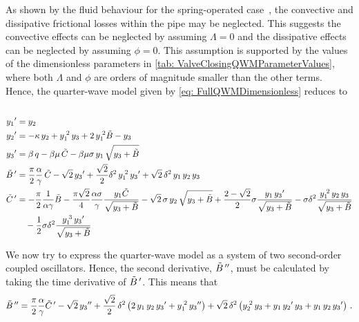 As shown by the fluid behaviour for the spring-operated case~\cite{Hos2015ModelPipe}, the convective and dissipative frictional losses within the pipe may be neglected. This suggests the convective effects can be neglected by assuming $\Lambda = 0$ and the dissipative effects can be neglected by assuming $\phi = 0$. This assumption is supported by the values of the dimensionless parameters in \cref{tab: ValveClosingQWMParameterValues}, where both $\Lambda$ and $\phi$ are orders of magnitude smaller than the other terms. Hence, the quarter-wave model given by \cref{eq: FullQWMDimensionless} reduces to
~
\begin{equation}
\begin{split}
    \dash{y_1} &= y_2 \\
    \dash{y_2} &= - \kappa \, y_2 + y_1\power{2} \, y_3 + 2 \, y_1\power{2} \tilde{B} - y_3 \\
    \dash{y_3} &= \beta \, q - \beta \mu \, \tilde{C} - \beta \mu \sigma \, y_1 \, \sqrt{y_3 + \tilde{B}} \\
    \dash{\tilde{B}\,} &= \frac{\pi}{2} \frac{\alpha}{\gamma} \, \tilde{C} - \sqrt{2} \, \dash{y_3} + \frac{\sqrt{2}}{2} \delta^2 \, y_1\power{2} \, \dash{y_3} + \sqrt{2} \, \delta^2 \, y_1 \, y_2 \, y_3 \\
    \dash{\tilde{C}\,} &=
    - \frac{\pi}{2} \frac{1}{\alpha \gamma} \tilde{B}
    - \frac{\pi \sqrt{2}}{4} \frac{\alpha \sigma}{\gamma} \frac{y_1 \tilde{C}}{\sqrt{y_3 + \tilde{B}}}
    - \sqrt{2} \, \sigma \, y_2 \, \sqrt{y_3 + \tilde{B}}
    + \frac{2-\sqrt{2}}{2} \sigma \frac{y_1 \, \dash{y_3}}{\sqrt{y_3 + \tilde{B}}}
    - \sigma \delta^2 \frac{y_1\power{2} \, y_2 \, y_3}{\sqrt{y_3 + \tilde{B}}}
    \\ & \quad %
    - \frac{1}{2} \sigma \delta^2 \frac{y_1\power{3} \, \dash{y_3}}{\sqrt{y_3 + \tilde{B}}} 
\end{split}
\end{equation}

We now try to express the quarter-wave model as a system of two second-order coupled oscillators. Hence, the second derivative, $\tilde{B}\,{''}$, must be calculated by taking the time derivative of $\tilde{B}\,{'}$. This means that
~
\begin{equation*}
    \tilde{B}\,{''} = \frac{\pi}{2} \frac{\alpha}{\gamma} \tilde{C}\,{'} - \sqrt{2} \, y_3{''} + \frac{\sqrt{2}}{2} \, \delta^2 \left( 2 \, y_1 \, y_2 \, y_3{'} + y_1^{\;2} \, y_3{''} \right) + \sqrt{2} \, \delta^2 \left( y_2^{\;2} \, y_3 + y_1 \, y_2{'} \, y_3 + y_1 \, y_2 \, y_3{'} \right) \, .
\end{equation*}

